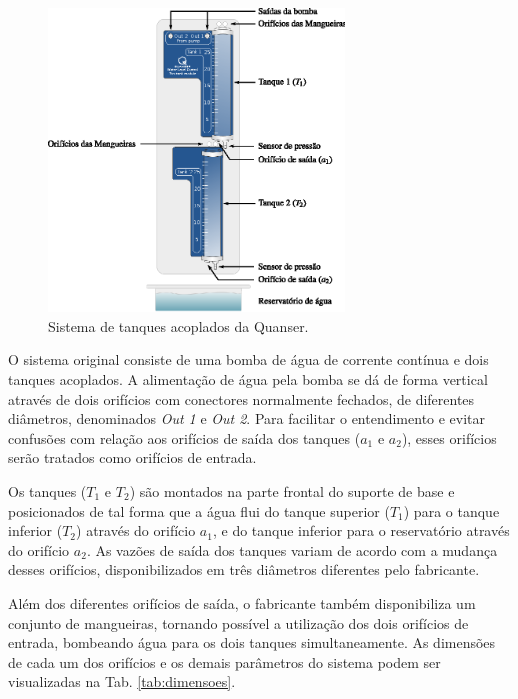 \begin{figure}[htb]
\centering
    \includegraphics[width=0.7\textwidth]{imgs/sistema/eps/tanques}
    \caption{Sistema de tanques acoplados da Quanser\reg.}
    \label{fig:tanques}
\end{figure}

O sistema original consiste de uma bomba de água de corrente contínua e dois
tanques acoplados. A alimentação de água pela bomba se dá de forma vertical
através de dois orifícios com conectores normalmente fechados, de diferentes
diâmetros, denominados {\it Out 1} e {\it Out 2}. Para facilitar o entendimento
e evitar confusões com relação aos orifícios de saída dos tanques ($a_1$ e
$a_2$), esses orifícios serão tratados como orifícios de entrada.


Os tanques ($T_1$ e $T_2$) são montados na parte frontal do suporte de base e
posicionados de tal forma que a água flui do tanque superior ($T_1$) para o
tanque inferior ($T_2$) através do orifício $a_1$, e do tanque inferior para o
reservatório através do orifício $a_2$. As vazões de saída dos tanques variam de
acordo com a mudança desses orifícios, disponibilizados em três diâmetros
diferentes pelo fabricante.


Além dos diferentes orifícios de saída, o fabricante também disponibiliza um
conjunto de mangueiras, tornando possível a utilização dos dois orifícios de
entrada, bombeando água para os dois tanques simultaneamente. As dimensões de
cada um dos orifícios e os demais parâmetros do sistema podem ser visualizadas
na Tab. \ref{tab:dimensoes}.

